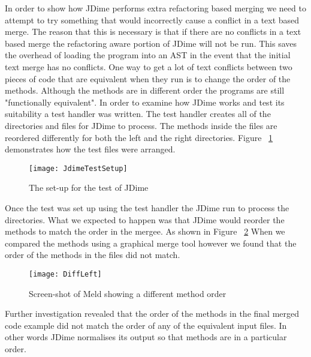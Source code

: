 In order to show how JDime performs extra refactoring based merging we need to attempt to try something that would incorrectly cause a conflict in a text based merge.  The reason that this is necessary is that if there are no conflicts in a text based merge the refactoring aware portion of JDime will not be run.  This saves the overhead of loading the program into an AST in the event that the initial text merge has no conflicts. 
One way to get a lot of text conflicts between two pieces of code that are equivalent when they run is to change the order of the methods.
Although the methods are in different order the programs are still "functionally equivalent".
In order to examine how JDime works and test its suitability a test handler was written.
The test handler creates all of the directories and files for JDime to process.
The methods inside the files are reordered differently for both the left and the right directories.
Figure ~\ref{fig:bgJDimeTest} demonstrates how the test files were arranged.


\begin{figure}[!t]
\begin{center}
\texttt{[image: JdimeTestSetup]}
\end{center}
 \label{fig:bgJDimeTest}
 \caption{The set-up for the test of JDime}
\end{figure}

Once the test was set up using the test handler the JDime run to process the directories.
What we expected to happen was that JDime would reorder the methods to match the order in the mergee. As shown in Figure ~\ref{fig:bgJDimeScreenShot} When we compared the methods using a graphical merge tool however we found that the order of the methods in the files did not match.

\begin{figure}[!t]
\begin{center}
\texttt{[image: DiffLeft]}
\end{center}
 \label{fig:bgJDimeScreenShot}
 \caption{Screen-shot of Meld showing a different method order}
\end{figure}


Further investigation revealed that the order of the methods in the final merged code example did not match the order of any of the equivalent input files.    
In other words JDime normalises its output so that methods are in a particular order.

